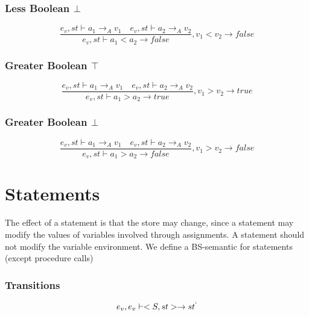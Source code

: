 \subsubsection{Less Boolean $\bot$}
\begin{equation}
	\frac { { e }_{ v },st\vdash { a }_{ 1 }{ \rightarrow  }_{ A }{ v }_{ 1 }\quad { e }_{ v },st\vdash { a }_{ 2 }{ \rightarrow  }_{ A }{ v }_{ 2 } }{ { e }_{ v },st\vdash { a }_{ 1 }<{ a }_{ 2 }{ \rightarrow  }false } ,{ v }_{ 1 }<{ v }_{ 2 }\rightarrow false
\end{equation}

\subsubsection{Greater Boolean $\top$}
\begin{equation}
	\frac { { e }_{ v },st\vdash { a }_{ 1 }{ \rightarrow  }_{ A }{ v }_{ 1 }\quad { e }_{ v },st\vdash { a }_{ 2 }{ \rightarrow  }_{ A }{ v }_{ 2 } }{ { e }_{ v },st\vdash { a }_{ 1 }>{ a }_{ 2 }{ \rightarrow  }true } ,{ v }_{ 1 }>{ v }_{ 2 }\rightarrow true
\end{equation}

\subsubsection{Greater Boolean $\bot$}
\begin{equation}
	\frac { { e }_{ v },st\vdash { a }_{ 1 }{ \rightarrow  }_{ A }{ v }_{ 1 }\quad { e }_{ v },st\vdash { a }_{ 2 }{ \rightarrow  }_{ A }{ v }_{ 2 } }{ { e }_{ v },st\vdash { a }_{ 1 }>{ a }_{ 2 }{ \rightarrow  }false } ,{ v }_{ 1 }>{ v }_{ 2 }\rightarrow false
\end{equation}

\section*{Statements}
The effect of a statement is that the store may change, since a statement may modify the values of variables involved through assignments.
A statement should not modify the variable environment.
We define a BS-semantic for statements (except procedure calls)
\subsubsection{Transitions}
\begin{equation}
	{ e }_{ v },{ e }_{ v }\vdash <S,st>\rightarrow { st }^{ ` }
\end{equation}

